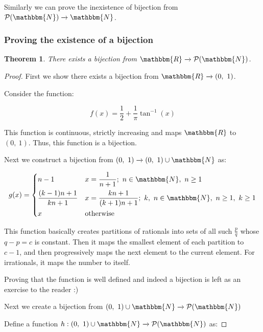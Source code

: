 \documentclass[14pt]{extarticle}
\newcommand{\impl}{\xrightarrow{}}
\newcommand{\N}{\mathbbm{N}}
\newcommand{\R}{\mathbbm{R}}
\newcommand{\powerset}{\mathcal{P}}
\newtheorem{theorem}{Theorem}
\begin{document}
Similarly we can prove the inexistence of bijection from $\powerset(\N) \impl \N$.

\subsubsection{Proving the existence of a bijection}

\begin{theorem}
    There exists a bijection from $\R \impl \powerset{(\N)}$.
\end{theorem}

\begin{proof}
    First we show there exists a bijection from $\R \impl (0, \ 1)$.

    Consider the function:

    \[
        f(x) = \frac{1}{2} + \frac{1}{\pi}\tan^{-1}{(x)}
    \]

    This function is continuous, strictly increasing and maps $\R$ to $(0, \ 1)$. Thus, this function is a bijection.

    Next we construct a bijection from $(0, \ 1) \impl (0, \ 1) \cup \N$ as:

    \[
        g(x) = \begin{dcases}
            n-1 & x = \frac{1}{n+1}; \ n \in \N, \ n \geq 1 \\
            \frac{(k-1)n+1}{kn+1} & x = \frac{kn+1}{(k+1)n+1}; \ k,\ n \in \N, \ n \geq 1, \ k \geq 1 \\
            x & \text{otherwise}
        \end{dcases}
    \]

    This function basically creates partitions of rationals into sets of all such $\frac{p}{q}$ whose $q-p=c$ is constant. Then it maps the smallest element of each partition to $c-1$, and then progressively maps the next element to the current element. For irrationals, it maps the number to itself.

    Proving that the function is well defined and indeed a bijection is left as an exercise to the reader :)

    Next we create a bijection from $(0, \ 1) \cup \N \impl \powerset(\N)$

    Define a function $h : (0, \ 1) \cup \N \impl \powerset(\N)$ as:


\end{proof}
\end{document}
